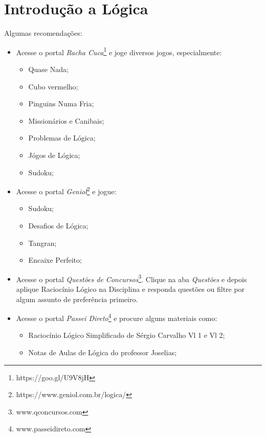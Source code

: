 \chapter{Introdução a Lógica}



Algumas recomendações:
\begin{itemize}
    \item Acesse o portal \textit{Racha Cuca}\footnote{https://goo.gl/U9V8jH} e joge diversos jogos, especialmente:
    \begin{multicols}{2}
        \begin{itemize}
        \item Quase Nada;
        \item Cubo vermelho;
        \item Pinguins Numa Fria;
        \item Missionários e Canibais;
        \item Problemas de Lógica;
        \item Jógos de Lógica;
        \item Sudoku;
    \end{itemize}
    \end{multicols}
    \item Acesse o portal \textit{Geniol}\footnote{https://www.geniol.com.br/logica/} e jogue:
    \begin{multicols}{2}
    \begin{itemize}
        \item Sudoku;
        \item Desafios de Lógica;
        \item Tangran;
        \item Encaixe Perfeito;
    \end{itemize}
    \end{multicols}
    \item Acesse o portal \textit{Questões de Concursos}\footnote{www.qconcursos.com}. Clique na aba \textit{Questões} e depois aplique Raciocínio Lógico na Disciplina e responda questões ou filtre por algum assunto de preferência primeiro.
    \item Acesse o portal \textit{Passei Direto}\footnote{www.passeidireto.com} e procure alguns materiais como:
    \begin{itemize}
        \item Raciocínio Lógico Simplificado de Sérgio Carvalho Vl 1 e Vl 2;
        \item Notas de Aulas de Lógica do professor Joselias;
    \end{itemize}
\end{itemize}

